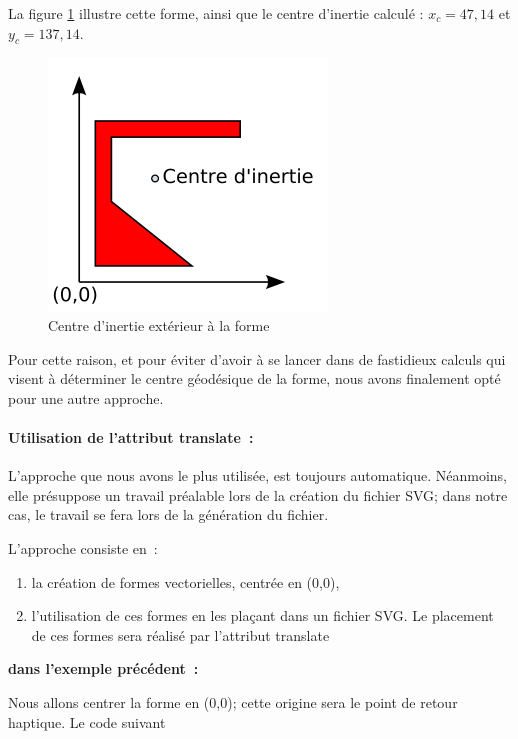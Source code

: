 \documentclass[
]{book}
\providecommand{\tightlist}{%
  \setlength{\itemsep}{0pt}\setlength{\parskip}{0pt}}
\begin{document}
La figure \ref{fig:centre} illustre cette forme, ainsi que le centre
d'inertie calculé : \(x_c=47,14\) et \(y_c=137,14\).

\begin{figure}
\centering
\includegraphics{img/centre.png}
\caption{\label{fig:centre}Centre d'inertie extérieur à la forme}
\end{figure}

Pour cette raison, et pour éviter d'avoir à se lancer dans de fastidieux
calculs qui visent à déterminer le centre géodésique de la forme, nous avons
finalement opté pour une autre approche.

\hypertarget{utilisation-de-lattribut-translate}{%
\paragraph{Utilisation de l'attribut translate~:}\label{utilisation-de-lattribut-translate}}

L'approche que nous avons le plus utilisée, est toujours automatique.
Néanmoins, elle présuppose un travail préalable lors de la création du
fichier SVG; dans notre cas, le travail se fera lors de la génération du
fichier.

L'approche consiste en~:

\begin{enumerate}
\def\labelenumi{\arabic{enumi}.}
\tightlist
\item
  la création de formes vectorielles, centrée en
  (0,0),
\item
  l'utilisation de ces formes en les plaçant dans un
  fichier SVG. Le placement de ces formes sera réalisé par l'attribut
  translate
\end{enumerate}

\textbf{dans l'exemple précédent~:}

Nous allons centrer la forme en (0,0); cette origine sera le point de
retour haptique. Le code suivant
\end{document}
